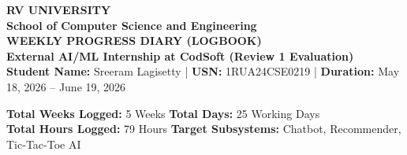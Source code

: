 \documentclass[11pt,a4paper]{article}
\begin{document}
\begin{center}
    \textbf{\Large RV UNIVERSITY}\\
    \textbf{\large School of Computer Science and Engineering}\\
    \vspace{0.15in}
    \textbf{\Large WEEKLY PROGRESS DIARY (LOGBOOK)}\\
    \vspace{0.05in}
    \textbf{\large External AI/ML Internship at CodSoft (Review 1 Evaluation)}\\
    \vspace{0.15in}
    \small
    \textbf{Student Name:} Sreeram Lagisetty \quad | \quad \textbf{USN:} 1RUA24CSE0219 \quad | \quad \textbf{Duration:} May 18, 2026 -- June 19, 2026
\end{center}

\vspace{0.1in}
\begin{tcolorbox}[colback=blue!5!white,colframe=blue!75!black,title=Internship Compliance Metrics]
    \textbf{Total Weeks Logged:} 5 Weeks \hfill \textbf{Total Days:} 25 Working Days \\
    \textbf{Total Hours Logged:} 79 Hours \hfill \textbf{Target Subsystems:} Chatbot, Recommender, Tic-Tac-Toe AI
\end{tcolorbox}
\end{document}
